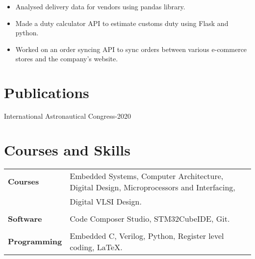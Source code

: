 \documentclass{resume}
\begin{document}

\begin{itemize}\setlength{\itemsep}{0pt}\setlength{\parskip}{0pt}\vspace{-0.5em}
    \item Analysed delivery data for vendors using pandas library.
    \item Made a duty calculator API to estimate customs duty using Flask and python.
    \item Worked on an order syncing API to sync orders between various e-commerce stores and the company's website.
\end{itemize}

\vspace{-0.5cm}
\section{Publications}
 { International Astronautical Congress-2020}
\section{Courses and Skills}
\vspace{-0.5cm}
\begin{table}[!htb]
    \begin{tabular}{l|l}
    \textbf{Courses}        &   Embedded Systems, Computer Architecture, Digital Design, Microprocessors and Interfacing,   \\
                            &   Digital VLSI Design.\\
                            &   \\
    \textbf{Software}       &   Code Composer Studio, STM32CubeIDE, Git.\\
                            &   \\
    \textbf{Programming}    &   Embedded C, Verilog, Python, Register level coding, \LaTeX.\\
    \end{tabular}
\end{table}
\vspace{-0.5cm}
\end{document}
